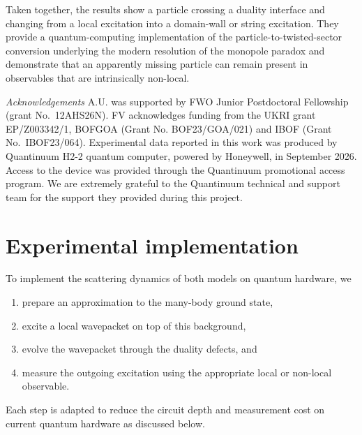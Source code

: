 \documentclass[aps,floatfix,10pt,amssymb,amsfont,amsmath,superscriptaddress,float,nofootinbib,longbibliography,nobalancelastpage,twocolumn]{revtex4-2}
\begin{document}
Taken together, the results show a particle crossing a duality interface and changing from a local excitation into a domain-wall or string excitation. They provide a quantum-computing implementation of the particle-to-twisted-sector conversion underlying the modern resolution of the monopole paradox and demonstrate that an apparently missing particle can remain present in observables that are intrinsically non-local.


{\it{Acknowledgements}}
A.U. was supported by FWO Junior Postdoctoral Fellowship (grant No.\ 12AHS26N). FV acknowledges funding from the UKRI grant EP/Z003342/1, BOFGOA
(Grant No. BOF23/GOA/021) and IBOF (Grant No.~IBOF23/064).
Experimental data reported in this work was produced by Quantinuum
H2-2 quantum computer, powered by Honeywell, in September 2026. Access to the device was provided through the Quantinuum promotional access program. We are extremely grateful to the Quantinuum technical and support team for the support they
provided during this project.


\clearpage
\appendix
\section{Experimental implementation}
\label{app:experimental_implementation}
To implement the scattering dynamics of both models on quantum hardware, we
\begin{enumerate}
    \item prepare an approximation to the many-body ground state,
    \item excite a local wavepacket on top of this background,
    \item evolve the wavepacket through the duality defects, and
    \item measure the outgoing excitation using the appropriate local or non-local observable.
\end{enumerate}
Each step is adapted to reduce the circuit depth and measurement cost on current quantum hardware as discussed below.
\end{document}
